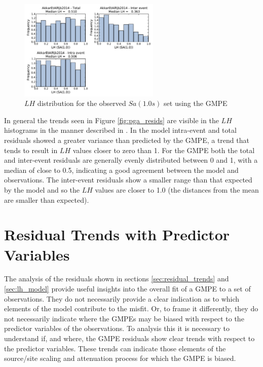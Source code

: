 \begin{figure}[htb]
	\centering
		\includegraphics[width=0.6\textwidth]{./figures/residuals/Akkar2014_LH_Sa1.pdf}
	\caption{$LH$ distribution for the observed $Sa \left( {1.0 s} \right)$ set using the \cite{Akkar_etal2014} GMPE}
	\label{fig:sa1_lh_akkar2014}
\end{figure}

In general the trends seen in Figure \ref{fig:pga_resids} are visible in the $LH$ histograms in the manner described in \cite{Scherbaum_etal2004}. In the \cite{boore2008} model intra-event and total residuals showed a greater variance than predicted by the GMPE, a trend that tends to result in $LH$ values closer to zero than 1. For the \cite{Akkar_etal2014} GMPE both the total and inter-event residuals are generally evenly distributed between 0 and 1, with a median of close to 0.5, indicating a good agreement between the model and observations. The inter-event residuals show a smaller range than that expected by the model and so the $LH$ values are closer to 1.0 (the distances from the mean are smaller than expected). 

\section{Residual Trends with Predictor Variables}
\label{sec:predictor_trends}

The analysis of the residuals shown in sections \ref{sec:residual_trends} and \ref{sec:lh_model} provide useful insights into the overall fit of a GMPE to a set of observations. They do not necessarily provide a clear indication as to which elements of the model contribute to the misfit. Or, to frame it differently, they do not necessarily indicate where the GMPEs may be biased with respect to the predictor variables of the observations. To analysis this it is necessary to understand if, and where, the GMPE residuals show clear trends with respect to the predictor variables. These trends can indicate those elements of the source/site scaling and attenuation process for which the GMPE is biased.

